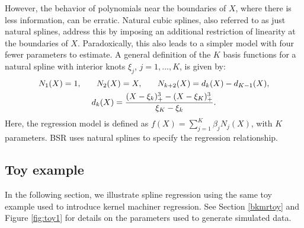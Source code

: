 \documentclass[12pt, twoside]{amherstthesis}
\begin{document}
However, the behavior of polynomials near the boundaries of \(X\), where there is less information, can be erratic. Natural cubic splines, also referred to as just natural splines, address this by imposing an additional restriction of linearity at the boundaries of \(X\). Paradoxically, this also leads to a simpler model with four fewer parameters to estimate. A general definition of the \(K\) basis functions for a natural spline with interior knots \(\xi_j\), \(j=1,\dots,K\), is given by:
\begin{gather*}
N_1(X)=1, \hspace{0.25in} N_2(X)=X, \hspace{0.25in} N_{k+2}(X)=d_k(X)-d_{K-1}(X), \\
d_k(X)=\frac{(X-\xi_k)^3_+ - (X-\xi_K)^3_+}{\xi_K-\xi_k}.
\end{gather*}
\noindent Here, the regression model is defined as \(f(X) = \sum_{j=1}^K\beta_jN_j(X)\), with \(K\) parameters. BSR uses natural splines to specify the regression relationship.

\hypertarget{toy-example}{%
\subsection{Toy example}\label{toy-example}}

In the following section, we illustrate spline regression using the same toy example used to introduce kernel machiner regression. See Section \ref{bkmrtoy} and Figure \ref{fig:toy1} for details on the parameters used to generate simulated data.
\end{document}
